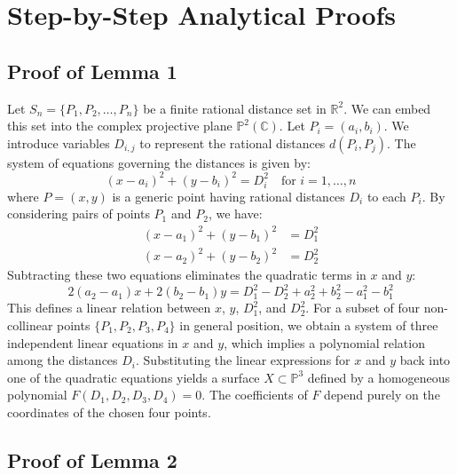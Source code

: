 \documentclass[12pt,a4paper]{article}
\begin{document}
\section{Step-by-Step Analytical Proofs}

\subsection{Proof of Lemma 1}

Let $S_n = \{P_1, P_2, \dots, P_n\}$ be a finite rational distance set in $\mathbb{R}^2$. We can embed this set into the complex projective plane $\mathbb{P}^2(\mathbb{C})$. Let $P_i = (a_i, b_i)$. We introduce variables $D_{i,j}$ to represent the rational distances $d(P_i, P_j)$.
The system of equations governing the distances is given by:
\begin{equation}
(x - a_i)^2 + (y - b_i)^2 = D_{i}^2 \quad \text{for } i = 1, \dots, n
\end{equation}
where $P = (x, y)$ is a generic point having rational distances $D_i$ to each $P_i$.
By considering pairs of points $P_1$ and $P_2$, we have:
\begin{align}
(x - a_1)^2 + (y - b_1)^2 &= D_1^2 \\
(x - a_2)^2 + (y - b_2)^2 &= D_2^2
\end{align}
Subtracting these two equations eliminates the quadratic terms in $x$ and $y$:
\begin{equation}
2(a_2 - a_1)x + 2(b_2 - b_1)y = D_1^2 - D_2^2 + a_2^2 + b_2^2 - a_1^2 - b_1^2
\end{equation}
This defines a linear relation between $x$, $y$, $D_1^2$, and $D_2^2$. For a subset of four non-collinear points $\{P_1, P_2, P_3, P_4\}$ in general position, we obtain a system of three independent linear equations in $x$ and $y$, which implies a polynomial relation among the distances $D_i$.
Substituting the linear expressions for $x$ and $y$ back into one of the quadratic equations yields a surface $X \subset \mathbb{P}^3$ defined by a homogeneous polynomial $F(D_1, D_2, D_3, D_4) = 0$. The coefficients of $F$ depend purely on the coordinates of the chosen four points.

\subsection{Proof of Lemma 2}
\end{document}
